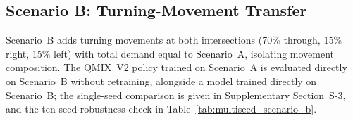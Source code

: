 \documentclass[review,12pt]{elsarticle}
\begin{document}
\subsection{Scenario B: Turning-Movement Transfer}
\label{subsec:scenario_b}

Scenario~B adds turning movements at both intersections (70\% through, 15\% right, 15\% left) with total demand equal to Scenario~A, isolating movement composition. The QMIX~V2 policy trained on Scenario~A is evaluated directly on Scenario~B without retraining, alongside a model trained directly on Scenario~B; the single-seed comparison is given in Supplementary Section~S-3, and the ten-seed robustness check in Table~\ref{tab:multiseed_scenario_b}.

\begin{table}[H]
\centering
\caption{Multi-seed robustness in Scenario~B. Values are mean $\pm$ standard deviation across ten SUMO seeds.}
\label{tab:multiseed_scenario_b}
\end{table}
\end{document}
